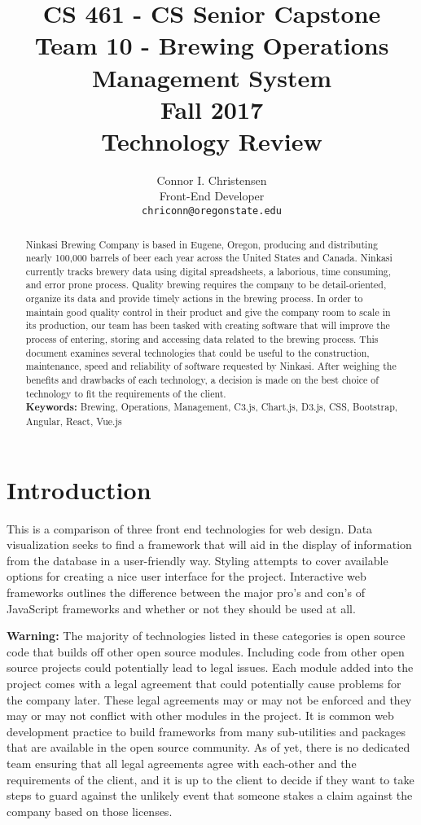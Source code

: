 \documentclass[draftclsnofoot,onecolumn,letterpaper,10pt,compsoc]{IEEEtran}
\title{CS 461 - CS Senior Capstone
  \\Team 10 - Brewing Operations Management System
	\\Fall 2017
	\\Technology Review
}
\author{
	Connor I. Christensen \\
  \small{Front-End Developer} \\
	\texttt{chriconn@oregonstate.edu}
}
\begin{document}
\begin{titlingpage}
    \maketitle
    \begin{abstract}
      Ninkasi Brewing Company is based in Eugene, Oregon, producing and distributing nearly 100,000 barrels of beer each year across the United States and Canada.
      Ninkasi currently tracks brewery data using digital spreadsheets, a laborious, time consuming, and error prone process.
      Quality brewing requires the company to be detail-oriented, organize its data and provide timely actions in the brewing process.
      In order to maintain good quality control in their product and give the company room to scale in its production, our team has been tasked with creating software that will improve the process of entering, storing and accessing data related to the brewing process.
      This document examines several technologies that could be useful to the construction, maintenance, speed and reliability of software requested by Ninkasi.
      After weighing the benefits and drawbacks of each technology, a decision is made on the best choice of technology to fit the requirements of the client.
      \\
      \textbf{Keywords:} Brewing, Operations, Management, C3.js, Chart.js, D3.js, CSS, Bootstrap, Angular, React, Vue.js
    \end{abstract}
		\pagebreak
		\tableofcontents
\end{titlingpage}

\section{Introduction}

  This is a comparison of three front end technologies for web design.
  Data visualization seeks to find a framework that will aid in the display of information from the database in a user-friendly way.
  Styling attempts to cover available options for creating a nice user interface for the project.
  Interactive web frameworks outlines the difference between the major pro's and con's of JavaScript frameworks and whether or not they should be used at all.

  \textbf{Warning:}
  The majority of technologies listed in these categories is open source code that builds off other open source modules.
  Including code from other open source projects could potentially lead to legal issues.
  Each module added into the project comes with a legal agreement that could potentially cause problems for the company later.
  These legal agreements may or may not be enforced and they may or may not conflict with other modules in the project.
  It is common web development practice to build frameworks from many sub-utilities and packages that are available in the open source community.
  As of yet, there is no dedicated team ensuring that all legal agreements agree with each-other and the requirements of the client, and it is up to the client to decide if they want to take steps to guard against the unlikely event that someone stakes a claim against the company based on those licenses.
\end{document}
